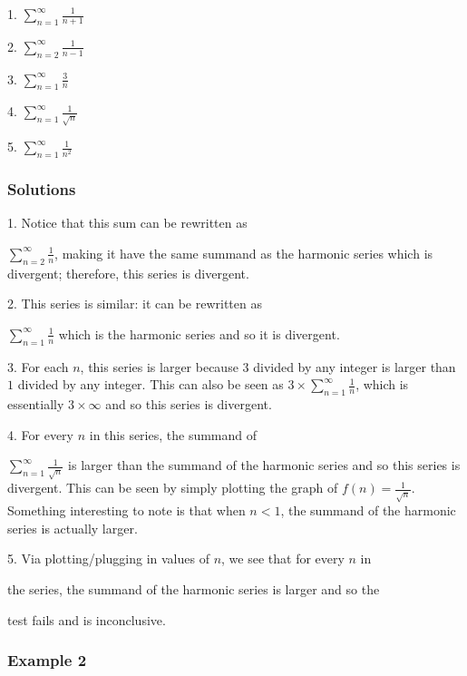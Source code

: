 1.  $\sum _{n=1}^{\infty}{\frac{1}{n+1}}$

2.  $\sum _{n=2}^{\infty}{\frac{1}{n-1}}$

3.  $\sum _{n=1}^{\infty}{\frac{3}{n}}$

4.  $\sum _{n=1}^{\infty}{\frac{1}{\sqrt{n}}}$

5.  $\sum _{n=1}^{\infty}{\frac{1}{n^2}}$


\subsubsection{Solutions}
\label{sss:solu-8692}


1.  Notice that this sum can be rewritten as

    $\sum _{n=2}^{\infty}{\frac{1}{n}}$, making it have the same summand as the harmonic series which is divergent; therefore, this series is divergent.

2.  This series is similar: it can be rewritten as

    $\sum _{n=1}^{\infty}{\frac{1}{n}}$ which is the harmonic series and so it is divergent.

3.  For each $n$, this series is larger because $3$ divided by any integer is larger than $1$ divided by any integer. This can also be seen as $3 \times \sum _{n=1}^{\infty}{\frac{1}{n}}$, which is essentially $3 \times \infty$ and so this series is divergent.

4.  For every $n$ in this series, the summand of

    $\sum _{n=1}^{\infty}{\frac{1}{\sqrt{n}}}$ is larger than the summand     of the harmonic series and so this series is divergent. This can be     seen by simply plotting the graph of $f(n)=\frac{1}{\sqrt{n}}$. Something interesting to note is that when $n < 1$, the summand of     the harmonic series is actually larger.

5.  Via plotting/plugging in values of $n$, we see that for every $n$ in

    the series, the summand of the harmonic series is larger and so the

    test fails and is inconclusive.


\subsubsection{Example 2}
\label{sss:exam-5bdd}

